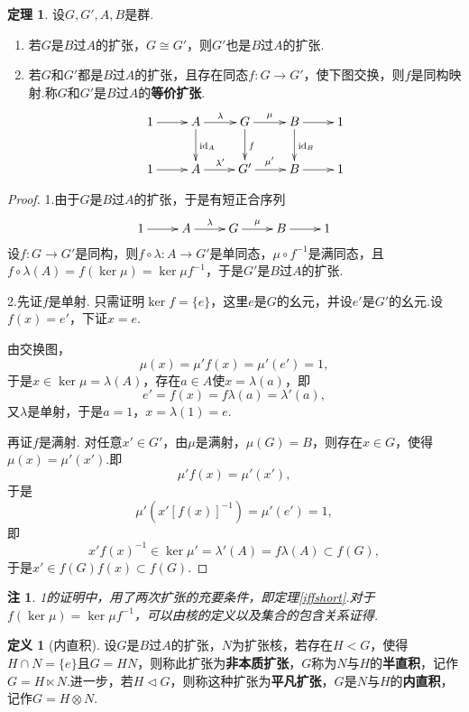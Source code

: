 \documentclass[12pt]{ctexart}
\theoremstyle{definition}
\newtheorem{definition}{定义}
\newtheorem{theorem}{定理}
\theoremstyle{plain}
\newtheorem*{remark}{注}
\newcommand{\id}{\mathrm{id}}
\begin{document}
	\begin{theorem}
		设$G,G',A,B$是群.
		\begin{enumerate}
			\item 若$G$是$B$过$A$的扩张，$G\cong G'$，则$G'$也是$B$过$A$的扩张.
			\item 若$G$和$G'$都是$B$过$A$的扩张，且存在同态$f:G\to G'$，使下图交换，则$f$是同构映射.称$G$和$G'$是$B$过$A$的\textbf{等价扩张}.
			\begin{displaymath}
				\xymatrix{
					1\ar[r] & A\ar[r]^{\lambda}\ar[d]^{\id_A} & G\ar[r]^{\mu}\ar[d]^{f} & B\ar[r]\ar[d]^{\id_B} & 1\\
					1\ar[r] & A\ar[r]^{\lambda'} & G'\ar[r]^{\mu'} & B\ar[r] & 1
				}
			\end{displaymath}
		\end{enumerate}
	\end{theorem}
	\begin{proof}
		1.由于$G$是$B$过$A$的扩张，于是有短正合序列
		\begin{displaymath}
			\xymatrix{
				1\ar[r] & A\ar[r]^{\lambda} & G\ar[r]^{\mu} & B\ar[r] & 1
			}
		\end{displaymath}
		设$f:G\to G'$是同构，则$f\circ\lambda:A\to G'$是单同态，$\mu\circ f^{-1}$是满同态，且$f\circ\lambda(A)=f(\ker\mu)=\ker\mu f^{-1}$，于是$G'$是$B$过$A$的扩张.
		
		2.先证$f$是单射. 只需证明$\ker f=\{e\}$，这里$e$是$G$的幺元，并设$e'$是$G'$的幺元.设$f(x)=e'$，下证$x=e$.
		
		由交换图，
		$$\mu(x)=\mu'f(x)=\mu'(e')=1,$$
		于是$x\in\ker\mu=\lambda(A)$，存在$a\in A$使$x=\lambda(a)$，即
		$$e'=f(x)=f\lambda(a)=\lambda'(a),$$
		又$\lambda$是单射，于是$a=1$，$x=\lambda(1)=e$.
		
		再证$f$是满射. 对任意$x'\in G'$，由$\mu$是满射，$\mu(G)=B$，则存在$x\in G$，使得$\mu(x)=\mu'(x')$.即
		$$\mu'f(x)=\mu'(x'),$$
		于是
		$$\mu'\left(x'\left[f(x)\right]^{-1}\right)=\mu'(e')=1,$$
		即
		$$x'f(x)^{-1}\in\ker\mu'=\lambda'(A)=f\lambda(A)\subset f(G),$$
		于是$x'\in f(G)f(x)\subset f(G)$.
	\end{proof}
	\begin{remark}
		1的证明中，用了两次扩张的充要条件，即定理\ref{iffshort}.对于$f(\ker\mu)=\ker\mu f^{-1}$，可以由核的定义以及集合的包含关系证得.
	\end{remark}
	\begin{definition}[内直积]
		设$G$是$B$过$A$的扩张，$N$为扩张核，若存在$H<G$，使得$H\cap N=\{e\}$且$G=HN$，则称此扩张为\textbf{非本质扩张}，$G$称为$N$与$H$的\textbf{半直积}，记作$G=H\ltimes N$.进一步，若$H\lhd G$，则称这种扩张为\textbf{平凡扩张}，$G$是$N$与$H$的\textbf{内直积}，记作$G=H\otimes N$.
	\end{definition}
\end{document}

